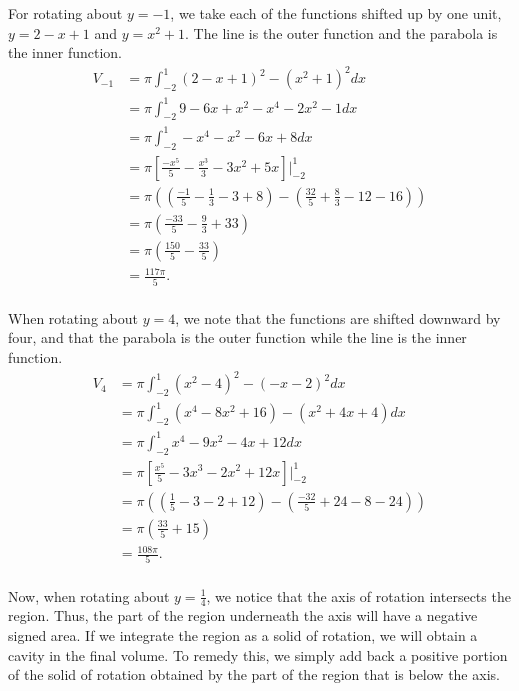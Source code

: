 \documentclass[../hw6.tex]{subfiles}
\begin{document}
For rotating about $y=-1$, we take each of the functions shifted up by one unit, $y=2-x+1$ and $y=x^2+1$. The line is the outer function and the parabola is the inner function.
\begin{align*}
    V_{-1} &= \pi \int_{-2}^{1} {(2-x+1)}^2 - {(x^2+1)}^2 dx \\
    &= \pi \int_{-2}^{1} 9-6x+x^2-x^4-2x^2-1 dx \\
    &= \pi \int_{-2}^{1} -x^4-x^2-6x+8 dx \\
    &= \pi \left[ \frac{-x^5}{5}-\frac{x^3}{3}-3x^2+5x \right] \Bigg\vert_{-2}^{1} \\
    &= \pi \left( \left( \frac{-1}{5}-\frac{1}{3}-3+8 \right) - \left( \frac{32}{5}+\frac{8}{3}-12-16 \right) \right) \\
    &= \pi \left( \frac{-33}{5}-\frac{9}{3}+33 \right) \\
    &= \pi \left( \frac{150}{5} - \frac{33}{5} \right) \\
    &= \frac{117 \pi}{5}. \\
\end{align*}

When rotating about $y=4$, we note that the functions are shifted downward by four, and that the parabola is the outer function while the line is the inner function.
\begin{align*}
    V_4 &= \pi \int_{-2}^{1} {(x^2-4)}^2-{(-x-2)}^2 dx \\
    &= \pi \int_{-2}^{1} \left( x^4-8x^2+16 \right) - \left( x^2+4x+4 \right) dx \\
    &= \pi \int_{-2}^{1} x^4-9x^2-4x+12 dx \\
    &= \pi \left[ \frac{x^5}{5}-3x^3-2x^2+12x \right] \Bigg\vert_{-2}^{1} \\
    &= \pi \left( \left( \frac{1}{5}-3-2+12\right) - \left( \frac{-32}{5}+24-8-24 \right) \right) \\
    &= \pi \left( \frac{33}{5}+15 \right) \\
    &= \frac{108 \pi}{5}. \\
\end{align*}

Now, when rotating about $y=\frac{1}{4}$, we notice that the axis of rotation intersects the region. Thus, the part of the region underneath the axis will have a negative signed area. If we integrate the region as a solid of rotation, we will obtain a cavity in the final volume. To remedy this, we simply add back a positive portion of the solid of rotation obtained by the part of the region that is below the axis.
\end{document}
